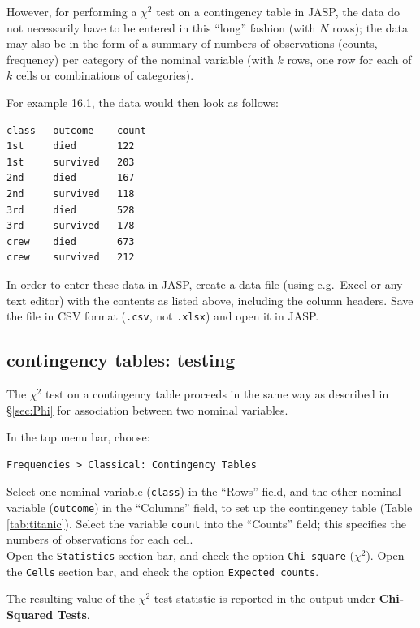 \documentclass[
]{book}
\begin{document}
However, for performing a \(\chi^2\) test on a contingency table in JASP, the data do not necessarily have to be entered in this ``long'' fashion (with \(N\) rows); the data may also be in the form of a summary of numbers of observations (counts, frequency) per category of the nominal variable (with \(k\) rows, one row for each of \(k\) cells or combinations of categories).

For example 16.1, the data would then look as follows:

\begin{verbatim}
class   outcome    count
1st     died       122
1st     survived   203
2nd     died       167
2nd     survived   118
3rd     died       528
3rd     survived   178
crew    died       673
crew    survived   212
\end{verbatim}

In order to enter these data in JASP, create a data file (using e.g.~Excel or any text editor) with the contents as listed above, including the column headers. Save the file in CSV format (\texttt{.csv}, not \texttt{.xlsx}) and open it in JASP.

\subsection{contingency tables: testing}\label{contingency-tables-testing-1}

The \(\chi^2\) test on a contingency table proceeds in the same way as described in
§\ref{sec:Phi} for association between two nominal variables.

In the top menu bar, choose:

\begin{verbatim}
Frequencies > Classical: Contingency Tables
\end{verbatim}

Select one nominal variable (\texttt{class}) in the ``Rows'' field, and the other nominal variable (\texttt{outcome}) in the ``Columns'' field, to set up the contingency table (Table \ref{tab:titanic}).
Select the variable \texttt{count} into the ``Counts'' field; this specifies the numbers of observations for each cell.\\
Open the \texttt{Statistics} section bar, and check the option \texttt{Chi-square} (\(\chi^2\)).
Open the \texttt{Cells} section bar, and check the option \texttt{Expected\ counts}.

The resulting value of the \(\chi^2\) test statistic is reported in the output under \textbf{Chi-Squared Tests}.
\end{document}
